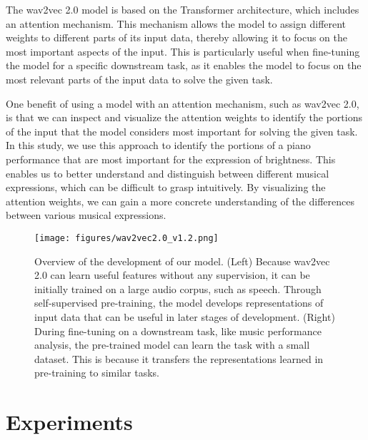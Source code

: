 \documentclass[manuscript,review,anonymous]{acmart}
\begin{document}
The wav2vec 2.0 model is based on the Transformer architecture, which includes an attention mechanism. 
This mechanism allows the model to assign different weights to different parts of its input data, thereby allowing it to focus on the most important aspects of the input. 
This is particularly useful when fine-tuning the model for a specific downstream task, as it enables the model to focus on the most relevant parts of the input data to solve the given task. 

One benefit of using a model with an attention mechanism, such as wav2vec 2.0, is that we can inspect and visualize the attention weights to identify the portions of the input that the model considers most important for solving the given task. 
In this study, we use this approach to identify the portions of a piano performance that are most important for the expression of brightness. 
This enables us to better understand and distinguish between different musical expressions, which can be difficult to grasp intuitively. 
By visualizing the attention weights, we can gain a more concrete understanding of the differences between various musical expressions.

\begin{figure}[h!]
  \centering
  \texttt{[image: figures/wav2vec2.0\_v1.2.png]}
  \caption{Overview of the development of our model. 
  (Left) Because wav2vec 2.0 can learn useful features without any supervision, it can be initially trained on a large audio corpus, such as speech. 
  Through self-supervised pre-training, the model develops representations of input data that can be useful in later stages of development. 
  (Right) During fine-tuning on a downstream task, like music performance analysis, the pre-trained model can learn the task with a small dataset.
  This is because it transfers the representations learned in pre-training to similar tasks.}
  \Description{}
  \label{model_overview}
\end{figure}


\section{Experiments}
\end{document}
